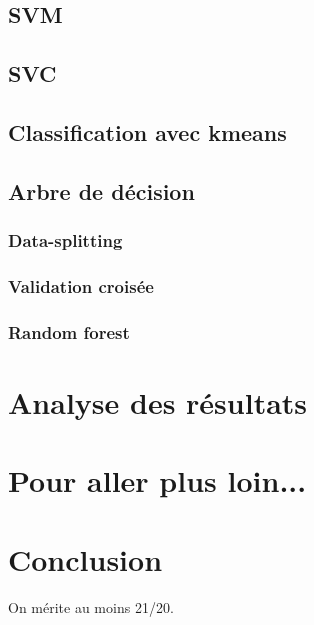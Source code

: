 \documentclass[11pt,a4paper]{article}
\begin{document}
	\subsection{SVM}


	\subsection{SVC}
	\subsection{Classification avec kmeans}

	\subsection{Arbre de décision}

		\subsubsection{Data-splitting}




		\subsubsection{Validation croisée}		


		\subsubsection{Random forest}

\section{Analyse des résultats}

\section{Pour aller plus loin...}

\section{Conclusion}
	On mérite au moins 21/20.




%
\end{document}
